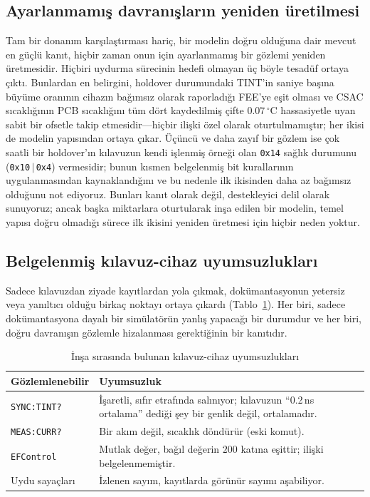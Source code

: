\documentclass[conference]{IEEEtran}
\begin{document}
\subsection{Ayarlanmamış davranışların yeniden üretilmesi}
Tam bir donanım karşılaştırması hariç, bir modelin doğru olduğuna dair mevcut en güçlü kanıt, hiçbir zaman onun için ayarlanmamış bir gözlemi yeniden üretmesidir. Hiçbiri uydurma sürecinin hedefi olmayan üç böyle tesadüf ortaya çıktı. Bunlardan en belirgini, holdover durumundaki TINT'in saniye başına büyüme oranının cihazın bağımsız olarak raporladığı FEE'ye eşit olması ve CSAC sıcaklığının PCB sıcaklığını tüm dört kaydedilmiş çifte $0.07\,^\circ$C hassasiyetle uyan sabit bir ofsetle takip etmesidir---hiçbir ilişki özel olarak oturtulmamıştır; her ikisi de modelin yapısından ortaya çıkar. Üçüncü ve daha zayıf bir gözlem ise çok saatli bir holdover'ın kılavuzun kendi işlenmiş örneği olan \texttt{0x14} sağlık durumunu (\texttt{0x10}\,$\vert$\,\texttt{0x4}) vermesidir; bunun kısmen belgelenmiş bit kurallarının uygulanmasından kaynaklandığını ve bu nedenle ilk ikisinden daha az bağımsız olduğunu not ediyoruz. Bunları kanıt olarak değil, destekleyici delil olarak sunuyoruz; ancak başka miktarlara oturtularak inşa edilen bir modelin, temel yapısı doğru olmadığı sürece ilk ikisini yeniden üretmesi için hiçbir neden yoktur.

\subsection{Belgelenmiş kılavuz-cihaz uyumsuzlukları}
Sadece kılavuzdan ziyade kayıtlardan yola çıkmak, dokümantasyonun yetersiz veya yanıltıcı olduğu birkaç noktayı ortaya çıkardı (Tablo~\ref{tab:discrepancies}). Her biri, sadece dokümantasyona dayalı bir simülatörün yanlış yapacağı bir durumdur ve her biri, doğru davranışın gözlemle hizalanması gerektiğinin bir kanıtıdır.

\begin{table}[t]
\caption{İnşa sırasında bulunan kılavuz-cihaz uyumsuzlukları}
\label{tab:discrepancies}
\centering
\renewcommand{\arraystretch}{1.25}
\begin{tabular}{@{}p{}p{}@{}}
\toprule
\textbf{Gözlemlenebilir} & \textbf{Uyumsuzluk} \\
\midrule
\texttt{SYNC:TINT?} & İşaretli, sıfır etrafında salınıyor; kılavuzun ``0.2\,ns ortalama'' dediği şey bir genlik değil, ortalamadır. \\
\texttt{MEAS:CURR?} & Bir akım değil, sıcaklık döndürür (eski komut). \\
\texttt{EFControl} & Mutlak değer, bağıl değerin $200$ katına eşittir; ilişki belgelenmemiştir. \\
Uydu sayaçları & İzlenen sayım, kayıtlarda görünür sayımı aşabiliyor. \\
\bottomrule
\end{tabular}
\end{table}
\end{document}
